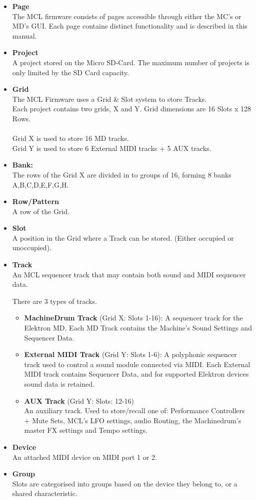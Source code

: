 \begin{itemize}
\item \textbf{Page}
\\
The MCL firmware consists of pages accessible through either the MC's or MD's GUI. Each page contains distinct functionality and is described in this manual.
\item \textbf{Project}
\\
A project stored on the Micro SD-Card.
The maximum number of projects is only limited by the SD Card capacity.

\item \textbf{Grid}
\\
The MCL Firmware uses a Grid \& Slot system to store Tracks.\\
Each project contains two grids, X and Y. Grid dimensions are 16 Slots x 128 Rows.\\
\\
Grid X is used to store 16 MD tracks.\\Grid Y is used to store 6 External MIDI tracks + 5 AUX tracks.
\item \textbf{Bank:}\\
The rows of the Grid X are divided in to groups of 16, forming 8 banks A,B,C,D,E,F,G,H.
\item \textbf{Row/Pattern}
\\
A row of the Grid.

\item \textbf{Slot}
\\
A position in the Grid where a Track can be stored. (Either occupied or unoccupied).
\item \textbf{Track}
\\
An MCL sequencer track that may contain both sound and MIDI sequencer data.

There are 3 types of tracks.
\begin{itemize}

\item \textbf{MachineDrum Track} (Grid X: Slots 1-16):
A sequencer track for the Elektron MD. Each MD Track contains the Machine's Sound Settings and Sequencer Data.

\item \textbf{External MIDI Track} (Grid Y: Slots 1-6):
A polyphonic sequencer track used to control a sound module connected via MIDI. Each External MIDI track contains Sequencer Data, and for supported Elektron devices sound data is retained. 

\item \textbf{AUX Track} (Grid Y: Slots: 12-16)\\
An auxiliary track. Used to store/recall one of: Performance Controllers + Mute Sets, MCL's LFO settings, audio Routing,  the Machinedrum's master FX settings and Tempo settings.
\end{itemize}

\item \textbf{Device}\\
An attached MIDI device on MIDI port 1 or 2.
\item \textbf{Group}
\\
Slots are categorised into groups based on the device they belong to, or a shared characteristic.
\end{itemize}